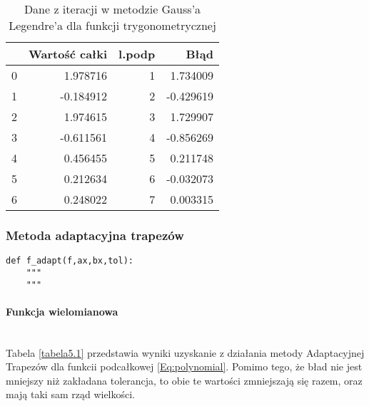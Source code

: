 \documentclass[12pt,twoside]{article}
\begin{document}
\begin{table}[H]
\centering
\caption{Dane z iteracji w metodzie Gauss'a Legendre'a dla funkcji trygonometrycznej}
\label{tabela4.2}
\begin{tabular}{lrrr}
\toprule
{} &  Wartość całki &  l.podp &      Błąd \\
\midrule
0 &       1.978716 &       1 &  1.734009 \\
1 &      -0.184912 &       2 & -0.429619 \\
2 &       1.974615 &       3 &  1.729907 \\
3 &      -0.611561 &       4 & -0.856269 \\
4 &       0.456455 &       5 &  0.211748 \\
5 &       0.212634 &       6 & -0.032073 \\
6 &       0.248022 &       7 &  0.003315 \\
\bottomrule
\end{tabular}
\end{table}

\subsubsection{Metoda adaptacyjna trapezów}

\begin{lstlisting}[caption={Kod w języku python implementujący metodę trapezów}]
def f_adapt(f,ax,bx,tol):
    """
    """
\end{lstlisting}
\label{Listing 10}

\paragraph{Funkcja wielomianowa}\mbox{} \\

Tabela \eqref{tabela5.1} przedstawia wyniki uzyskanie z działania metody Adaptacyjnej Trapezów dla funkcii podcałkowej \eqref{Eq:polynomial}. Pomimo tego, że bład nie jest mniejszy niż zakładana tolerancja, to obie te wartości zmniejszają się razem, oraz mają taki sam rząd wielkości.
\end{document}
